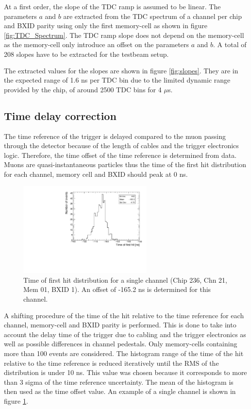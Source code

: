 \documentclass{JINST}
\begin{document}
At a first order, the slope of the TDC ramp is assumed to be linear. The parameters $a$ and $b$ are extracted from the TDC spectrum of a channel per chip and BXID parity using only the first memory-cell as shown in figure \ref{fig:TDC_Spectrum}. The TDC ramp slope does not depend on the memory-cell as the memory-cell only introduce an offset on the parameters $a$ and $b$. A total of 208 slopes have to be extracted for the testbeam setup.

The extracted values for the slopes are shown in figure \ref{fig:slopes}. They are in the expected range of 1.6 ns per TDC bin due to the limited dynamic range provided by the chip, of around 2500 TDC bins for 4 $\mu$s.

\subsection{Time delay correction}

The time reference of the trigger is delayed compared to the muon passing through the detector because of the length of cables and the trigger electronics logic. Therefore, the time offset of the time reference is determined from data. Muons are quasi-instantaneous particles thus the time of the first hit distribution for each channel, memory cell and BXID should peak at 0 ns.

\begin{figure}[htbp!]
	\centering
	\includegraphics[width=0.6\textwidth]{fig/Timing_Chip236_Chn21_Mem01_BXID1_withOffset.pdf}
	\caption{Time of first hit distribution for a single channel (Chip 236, Chn 21, Mem 01, BXID 1). An offset of -165.2 ns is determined for this channel.}\label{fig:TimeChnwithOffset}
\end{figure}

A shifting procedure of the time of the hit relative to the time reference for each channel, memory-cell and BXID parity is performed. This is done to take into account the delay time of the trigger due to cabling and the trigger electronics as well as possible differences in channel pedestals. Only memory-cells containing more than 100 events are considered. The histogram range of the time of the hit relative to the time reference is reduced iteratively until the RMS of the distribution is under 10 ns. This value was chosen because it corresponds to more than 3 sigma of the time reference uncertainty. The mean of the histogram is then used as the time offset value. An example of a single channel is shown in figure \ref{fig:TimeChnwithOffset}.
\end{document}
